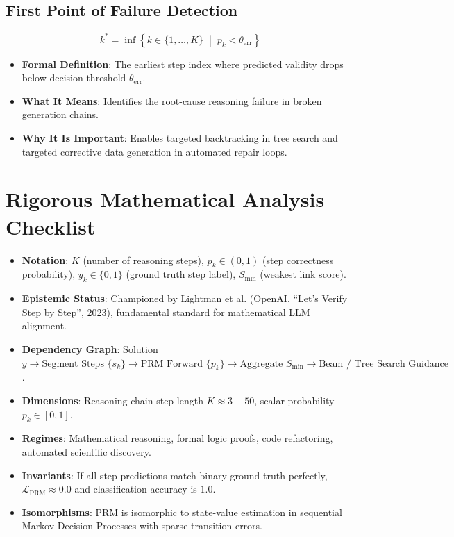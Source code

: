 \documentclass[11pt,a4paper]{article}
\theoremstyle{definition}
\begin{document}
\subsection{First Point of Failure Detection}
{\boldmath
\begin{equation}
k^* = \inf \left\{ k \in \{1, \dots, K\} \;\middle|\; p_k < \theta_{\text{err}} \right\}
\end{equation}
}
\begin{itemize}
    \item \textbf{Formal Definition}: The earliest step index where predicted validity drops below decision threshold $\theta_{\text{err}}$.
    \item \textbf{What It Means}: Identifies the root-cause reasoning failure in broken generation chains.
    \item \textbf{Why It Is Important}: Enables targeted backtracking in tree search and targeted corrective data generation in automated repair loops.
\end{itemize}

\section{Rigorous Mathematical Analysis Checklist}

\begin{itemize}
    \item \textbf{Notation}: $K$ (number of reasoning steps), $p_k \in (0, 1)$ (step correctness probability), $y_k \in \{0, 1\}$ (ground truth step label), $S_{\min}$ (weakest link score).
    \item \textbf{Epistemic Status}: Championed by Lightman et al. (OpenAI, ``Let's Verify Step by Step'', 2023), fundamental standard for mathematical LLM alignment.
    \item \textbf{Dependency Graph}: Solution $y \to \text{Segment Steps } \{s_k\} \to \text{PRM Forward } \{p_k\} \to \text{Aggregate } S_{\min} \to \text{Beam / Tree Search Guidance}$.
    \item \textbf{Dimensions}: Reasoning chain step length $K \approx 3 - 50$, scalar probability $p_k \in [0, 1]$.
    \item \textbf{Regimes}: Mathematical reasoning, formal logic proofs, code refactoring, automated scientific discovery.
    \item \textbf{Invariants}: If all step predictions match binary ground truth perfectly, $\mathcal{L}_{\text{PRM}} \approx 0.0$ and classification accuracy is $1.0$.
    \item \textbf{Isomorphisms}: PRM is isomorphic to state-value estimation in sequential Markov Decision Processes with sparse transition errors.
\end{itemize}
\end{document}
